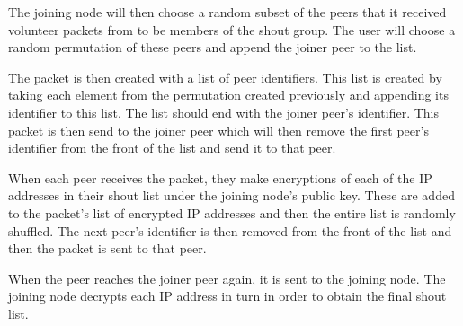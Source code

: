 \documentclass[ %
                    author={Luke Murray},
                supervisor={Dr. Simon Hollis},
                     title={Shadow Peer-to-Peer Networks},
                  subtitle={},
                    degree={MEng},
                      year={2013} ]{thesis}
\begin{document}
The joining node will then choose a random subset of the peers that it received volunteer packets from to be members of the shout group. The user will choose a random permutation of these peers and append the joiner peer to the list.

The packet is then created with a list of peer identifiers. This list is created by taking each element from the permutation created previously and appending its identifier to this list. The list should end with the joiner peer's identifier. This packet is then send to the joiner peer which will then remove the first peer's identifier from the front of the list and send it to that peer.

When each peer receives the packet, they make encryptions of each of the IP addresses in their shout list under the joining node's public key. These are added to the packet's list of encrypted IP addresses and then the entire list is randomly shuffled. The next peer's identifier is then removed from the front of the list and then the packet is sent to that peer.

When the peer reaches the joiner peer again, it is sent to the joining node. The joining node decrypts each IP address in turn in order to obtain the final shout list.
\end{document}
